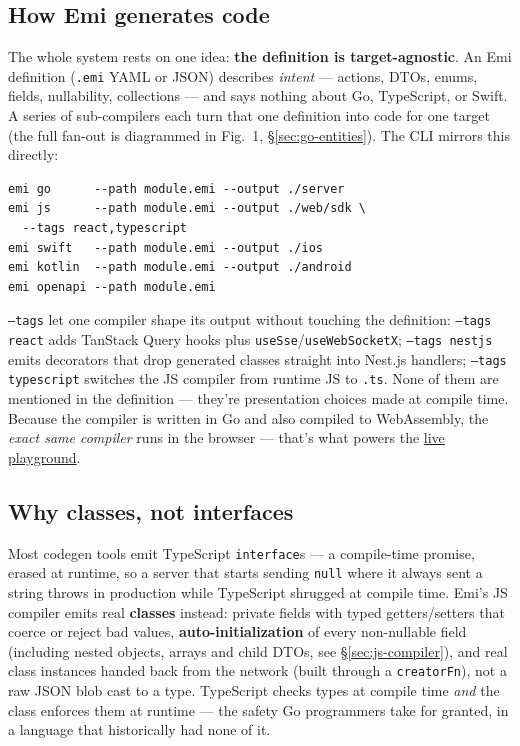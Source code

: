 \subsection{How Emi generates code}
The whole system rests on one idea: \textbf{the definition is
target-agnostic}. An Emi definition (\texttt{.emi} YAML or JSON) describes
\emph{intent} --- actions, DTOs, enums, fields, nullability, collections
--- and says nothing about Go, TypeScript, or Swift. A series of
sub-compilers each turn that one definition into code for one target
(the full fan-out is diagrammed in Fig.~1, \S\ref{sec:go-entities}).
The CLI mirrors this directly:
\begin{lstlisting}
emi go      --path module.emi --output ./server
emi js      --path module.emi --output ./web/sdk \
  --tags react,typescript
emi swift   --path module.emi --output ./ios
emi kotlin  --path module.emi --output ./android
emi openapi --path module.emi
\end{lstlisting}
\texttt{--tags} let one compiler shape its output without touching the
definition: \texttt{--tags react} adds TanStack Query hooks plus
\texttt{useSse}/\texttt{useWebSocketX}; \texttt{--tags nestjs} emits
decorators that drop generated classes straight into Nest.js handlers;
\texttt{--tags typescript} switches the JS compiler from runtime JS to
\texttt{.ts}. None of them are mentioned in the definition --- they're
presentation choices made at compile time. Because the compiler is
written in Go and also compiled to WebAssembly, the \emph{exact same
compiler} runs in the browser --- that's what powers the
\href{https://torabian.github.io/emi/playground}{live playground}.

\subsection{Why classes, not interfaces}
Most codegen tools emit TypeScript \texttt{interface}s --- a compile-time
promise, erased at runtime, so a server that starts sending \texttt{null}
where it always sent a string throws in production while TypeScript
shrugged at compile time. Emi's JS compiler emits real \textbf{classes}
instead: private fields with typed getters/setters that coerce or reject
bad values, \textbf{auto-initialization} of every non-nullable field
(including nested objects, arrays and child DTOs, see
\S\ref{sec:js-compiler}), and real class instances handed back from the
network (built through a \texttt{creatorFn}), not a raw JSON blob cast to
a type. TypeScript checks types at compile time \emph{and} the class
enforces them at runtime --- the safety Go programmers take for granted,
in a language that historically had none of it.
